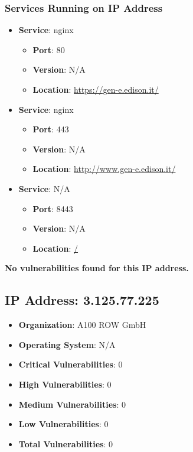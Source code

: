 \documentclass{article}
\begin{document}
\subsubsection*{Services Running on IP Address}

\begin{itemize}
    
        \item \textbf{Service}: nginx
        \begin{itemize}
            \item \textbf{Port}: 80
            \item \textbf{Version}:  N/A 
            \item \textbf{Location}: \href{ https://gen-e.edison.it/ }{ https://gen-e.edison.it/ }
        \end{itemize}
    
        \item \textbf{Service}: nginx
        \begin{itemize}
            \item \textbf{Port}: 443
            \item \textbf{Version}:  N/A 
            \item \textbf{Location}: \href{ http://www.gen-e.edison.it/ }{ http://www.gen-e.edison.it/ }
        \end{itemize}
    
        \item \textbf{Service}: N/A
        \begin{itemize}
            \item \textbf{Port}: 8443
            \item \textbf{Version}:  N/A 
            \item \textbf{Location}: \href{ / }{ / }
        \end{itemize}
    
\end{itemize}


\textbf{No vulnerabilities found for this IP address.}




\clearpage



\subsection{IP Address: 3.125.77.225}

\begin{itemize}
    \item \textbf{Organization}: A100 ROW GmbH
    \item \textbf{Operating System}:  N/A 
    \item \textbf{Critical Vulnerabilities}: 0
    \item \textbf{High Vulnerabilities}: 0
    \item \textbf{Medium Vulnerabilities}: 0
    \item \textbf{Low Vulnerabilities}: 0
    \item \textbf{Total Vulnerabilities}: 0
\end{itemize}
\end{document}
